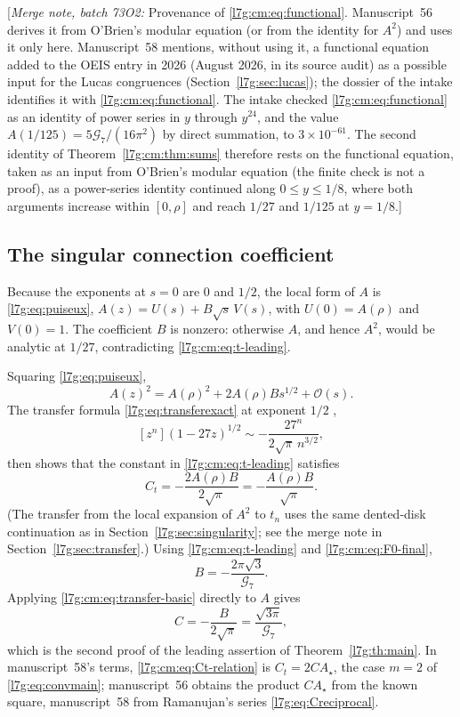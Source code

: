 \documentclass[11pt,letterpaper]{article}
\theoremstyle{remark}\newtheorem{remark}[theorem]{Remark}
\newcommand{\G}{\mathcal G_7}\newcommand{\Ast}{A_\star}
\newcommand{\bigO}{\mathcal O}\newcommand{\Ct}{C_{t}}
\newcommand{\mergenote}[1]{\textup{[}\emph{Merge note, batch 73O2:} #1\textup{]}}
\newcounter{l7gtrsavedeq}
\begin{document}
\mergenote{Provenance of \eqref{l7g:cm:eq:functional}. Manuscript~56
derives it from O'Brien's modular equation (or from the identity for
$A^2$) and uses it only here. Manuscript~58 mentions, without using it, a
functional equation added to the OEIS entry in 2026 (August 2026, in its
source audit) as a possible input for the Lucas congruences
(Section~\ref{l7g:sec:lucas}); the dossier of the intake identifies it
with \eqref{l7g:cm:eq:functional}. The intake checked
\eqref{l7g:cm:eq:functional} as an identity of power series in $y$ through
$y^{24}$, and the value $A(1/125)=5\G/(16\pi^2)$ by direct summation, to
$3\times10^{-61}$. The second identity of Theorem~\ref{l7g:cm:thm:sums}
therefore rests on the functional equation, taken as an input from
O'Brien's modular equation (the finite check is not a proof), as a
power-series identity continued along $0\le y\le1/8$, where both arguments
increase within $[0,\rho]$ and reach $1/27$ and $1/125$ at $y=1/8$.}

\subsection{The singular connection coefficient}\label{l7g:cm:sec:connection}
Because the exponents at $s=0$ are $0$ and $1/2$, the local form of $A$ is
\eqref{l7g:eq:puiseux}, $A(z)=U(s)+B\sqrt{s}\,V(s)$, with $U(0)=A(\rho)$ and
$V(0)=1$. The coefficient $B$ is nonzero: otherwise $A$, and hence $A^2$,
would be analytic at $1/27$, contradicting \eqref{l7g:cm:eq:t-leading}.

Squaring \eqref{l7g:eq:puiseux},
\begin{equation}\label{l7g:cm:eq:G-local}
 A(z)^2=A(\rho)^2+2A(\rho)Bs^{1/2}+\bigO(s).
\end{equation}
The transfer formula \eqref{l7g:eq:transferexact} at exponent $1/2$
\cite[Ch.~VI]{l7g:flajolet},
\begin{equation}\label{l7g:cm:eq:transfer-basic}
 [z^n](1-27z)^{1/2}
 \sim-\frac{27^n}{2\sqrt\pi\,n^{3/2}},
\end{equation}
then shows that the constant in \eqref{l7g:cm:eq:t-leading} satisfies
\begin{equation}\label{l7g:cm:eq:Ct-relation}
 \Ct=-\frac{2A(\rho)B}{2\sqrt\pi}
 =-\frac{A(\rho)B}{\sqrt\pi}.
\end{equation}
(The transfer from the local expansion of $A^2$ to $t_n$ uses the same
dented-disk continuation as in Section~\ref{l7g:sec:singularity}; see the
merge note in Section~\ref{l7g:sec:transfer}.)
Using \eqref{l7g:cm:eq:t-leading} and \eqref{l7g:cm:eq:F0-final},
\begin{equation}\label{l7g:cm:eq:B0}
 \boxed{\displaystyle
 B=-\frac{2\pi\sqrt3}{\G}.}
\end{equation}
Applying \eqref{l7g:cm:eq:transfer-basic} directly to $A$ gives
\[
 C=-\frac{B}{2\sqrt\pi}
 =\frac{\sqrt{3\pi}}{\G},
\]
which is the second proof of the leading assertion of
Theorem~\ref{l7g:th:main}. In manuscript~58's terms,
\eqref{l7g:cm:eq:Ct-relation} is $\Ct=2C\Ast$, the case $m=2$ of
\eqref{l7g:eq:convmain}; manuscript~56 obtains the product $C\Ast$ from the
known square, manuscript~58 from Ramanujan's series
\eqref{l7g:eq:Creciprocal}.
\end{document}
